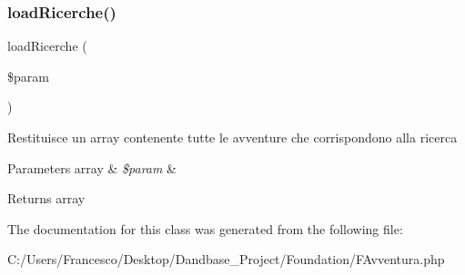 \subsubsection{\texorpdfstring{load\+Ricerche()}{loadRicerche()}}
{\footnotesize\ttfamily load\+Ricerche (\begin{DoxyParamCaption}\item[{}]{\$param }\end{DoxyParamCaption})}

Restituisce un array contenente tutte le avventure che corrispondono alla ricerca


\begin{DoxyParams}[1]{Parameters}
array & {\em \$param} & \\
\hline
\end{DoxyParams}
\begin{DoxyReturn}{Returns}
array 
\end{DoxyReturn}


The documentation for this class was generated from the following file\+:\begin{DoxyCompactItemize}
\item 
C\+:/\+Users/\+Francesco/\+Desktop/\+Dandbase\+\_\+\+Project/\+Foundation/F\+Avventura.\+php\end{DoxyCompactItemize}

